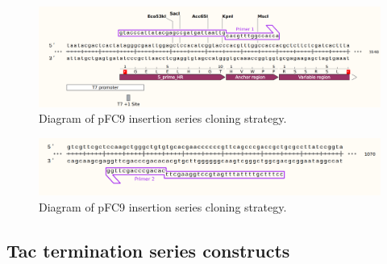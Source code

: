\documentclass[11pt]{article}
\begin{document}
\begin{figure}[H]
	\includegraphics[width=15cm]{images/primers/tac_init_primers/anchor-tac-promoter.png}
	\centering
	\caption{Diagram of pFC9 insertion series cloning strategy.}
\end{figure}

\begin{figure}[H]
	\includegraphics[width=15cm]{images/primers/tac_init_primers/extension-tac-terminators.png}
	\centering
	\caption{Diagram of pFC9 insertion series cloning strategy.}
\end{figure}


\subsection{Tac termination series constructs}
\label{sec:tac-termination}
\end{document}
